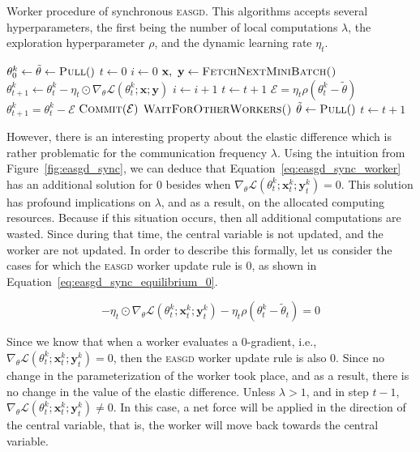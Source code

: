 \begin{algorithm}[H]
  \caption{Worker procedure of synchronous \textsc{easgd}. This algorithms accepts several hyperparameters, the first being the number of local computations $\lambda$, the exploration hyperparameter $\rho$, and the dynamic learning rate $\eta_t$.}
  \label{algo:easgd_worker}
  \begin{algorithmic}[1]
    \State $\theta^k_0 \gets \tilde{\theta} \gets \Call{Pull}$
    \State $t \gets 0$
    \State $i \gets 0$
    \State $\textbf{x},~\textbf{y} \gets \Call{FetchNextMiniBatch()}{}$
    \State $\theta^k_{t + 1} \gets \theta^k_t - \eta_t \odot \nabla_\theta \mathcal{L}(\theta^k_t;\textbf{x};\textbf{y})$
    \State $i \gets i + 1$
    \State $t \gets t + 1$
    \EndFor
    \State $\mathcal{E} = \eta_t\rho(\theta^k_t - \tilde{\theta})$
    \State $\theta^k_{t+1} = \theta^k_t - \mathcal{E}$
    \State $\Call{Commit}{\mathcal{E}}$
    \State $\Call{WaitForOtherWorkers()}{}$
    \State $\tilde{\theta} \gets \Call{Pull}$
    \State $t \gets t + 1$
    \EndWhile
    \EndProcedure
  \end{algorithmic}
\end{algorithm}

However, there is an interesting property about the elastic difference which is rather problematic for the communication frequency $\lambda$. Using the intuition from Figure~\ref{fig:easgd_sync}, we can deduce that Equation~\ref{eq:easgd_sync_worker} has an additional solution for 0 besides when $\nabla_\theta \mathcal{L}(\theta^k_t;\mathbf{x}^k_t;\mathbf{y}^k_t) = 0$. This solution has profound implications on $\lambda$, and as a result, on the allocated computing resources. Because if this situation occurs, then all additional computations are wasted. Since during that time, the central variable is not updated, and the worker are not updated. In order to describe this formally, let us consider the cases for which the \textsc{easgd} worker update rule is 0, as shown in Equation~\ref{eq:easgd_sync_equilibrium_0}.

\begin{equation}
  \label{eq:easgd_sync_equilibrium_0}
  -\eta_t \odot \nabla_\theta \mathcal{L}(\theta^k_t;\mathbf{x}^k_t;\mathbf{y}^k_t) - \eta_t\rho(\theta^k_t - \tilde{\theta}_t) = 0
\end{equation}

Since we know that when a worker evaluates a 0-gradient, i.e., $\nabla_\theta \mathcal{L}(\theta^k_t;\mathbf{x}^k_t;\mathbf{y}^k_t) = 0$, then the \textsc{easgd} worker update rule is also 0. Since no change in the parameterization of the worker took place, and as a result, there is no change in the value of the elastic difference. Unless $\lambda > 1$, and in step $t - 1$, $\nabla_\theta \mathcal{L}(\theta^k_t;\mathbf{x}^k_t;\mathbf{y}^k_t) \neq 0$. In this case, a net force will be applied in the direction of the central variable, that is, the worker will move back towards the central variable.\\

